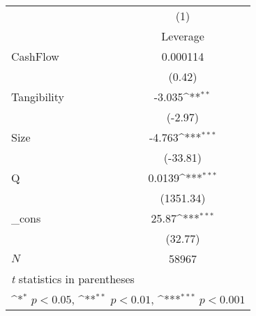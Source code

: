 {
\def\sym#1{\ifmmode^{#1}\else\(^{#1}\)\fi}
\begin{tabular}{l*{1}{c}}
\hline\hline
            &\multicolumn{1}{c}{(1)}\\
            &\multicolumn{1}{c}{Leverage}\\
\hline
CashFlow    &    0.000114         \\
            &      (0.42)         \\
[1em]
Tangibility &      -3.035\sym{**} \\
            &     (-2.97)         \\
[1em]
Size        &      -4.763\sym{***}\\
            &    (-33.81)         \\
[1em]
Q           &      0.0139\sym{***}\\
            &   (1351.34)         \\
[1em]
\_cons      &       25.87\sym{***}\\
            &     (32.77)         \\
\hline
\(N\)       &       58967         \\
\hline\hline
\multicolumn{2}{l}{\footnotesize \textit{t} statistics in parentheses}\\
\multicolumn{2}{l}{\footnotesize \sym{*} \(p<0.05\), \sym{**} \(p<0.01\), \sym{***} \(p<0.001\)}\\
\end{tabular}
}

